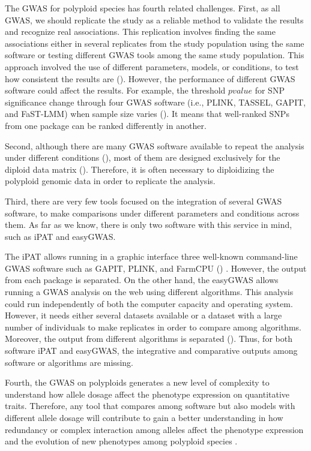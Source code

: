 \documentclass{article}
\begin{document}
The GWAS for polyploid species has fourth related challenges. First, as all GWAS, we should replicate the study as a reliable method to validate the results and recognize real associations. This replication involves finding the same associations either in several replicates from the study population using the  same software or testing different GWAS tools among the same study population.  This approach involved the use of different parameters, models, or conditions, to test how consistent the results are (\cite{De2014,Pearson2008}). However, the performance of different GWAS software could affect the results. For example, the threshold $pvalue$ for SNP significance change through four GWAS software (i.e., PLINK, TASSEL, GAPIT, and FaST-LMM) when sample size varies (\cite{Yan2019}). It means that well-ranked SNPs from one package can be ranked differently in another.

Second, although there are many GWAS software available to repeat the analysis under different conditions (\cite{Gumpinger2018}), most of them are designed exclusively for the diploid data matrix (\cite{Bourke2018}). Therefore, it is often necessary to \textquotedbl{}diploidizing\textquotedbl{} the polyploid genomic data in order to replicate the analysis.

Third, there are very few tools focused on the integration of several GWAS software, to make comparisons under different parameters and conditions across them. As far as we know, there is only two software with this service in mind, such as iPAT and easyGWAS.

The iPAT allows running in a graphic interface three well-known command-line GWAS software such as GAPIT, PLINK, and FarmCPU (\cite{Zhang2018}) . However, the output from each package is separated. On the other hand, the easyGWAS allows running a GWAS analysis on the web using different algorithms. This analysis could run independently of both the computer capacity and operating system. However, it needs either several datasets available or a dataset with a large number of individuals to make replicates in order to compare among algorithms. Moreover, the output from different algorithms is separated (\cite{Grimm2017}). Thus, for both software iPAT and easyGWAS, the integrative and comparative outputs among software or algorithms are missing.

Fourth, the GWAS on polyploids generates a new level of complexity to understand how allele dosage affect the phenotype expression on quantitative traits. Therefore, any tool that compares among software but also models with different allele dosage will contribute to gain a better understanding in how redundancy or complex interaction among alleles affect the phenotype expression and the evolution of new phenotypes among polyploid species  . 
\end{document}
